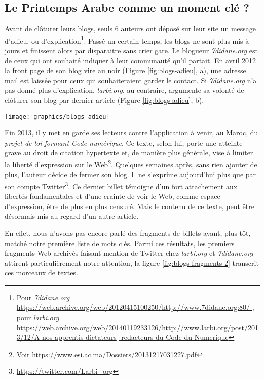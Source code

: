 \documentclass[symmetric,justified,marginals=raggedouter]{tufte-book}
\begin{document}
\subsection{Le Printemps Arabe comme un moment clé ?}

\noindent Avant de clôturer leurs blogs, seuls 6 auteurs ont déposé sur leur site un message d'adieu, ou d'explication\footnote{Pour \textit{7didane.org} \url{https://web.archive.org/web/20120415100250/http://www.7didane.org:80/ 
}, pour \textit{larbi.org} \url{https://web.archive.org/web/20140119233126/http://www.larbi.org/post/2013/12/A-nos-apprentis-dictateurs} \url{-redacteurs-du-Code-du-Numerique}}. Passé un certain temps, les blogs ne sont plus mis à jours et finissent alors par disparaitre sans crier gare. Le blogueur \textit{7didane.org} est de ceux qui ont souhaité indiquer à leur communauté qu'il partait. En avril 2012 la front page de son blog vire au noir (Figure \ref{fig:blogs-adieu}, a), une adresse mail est laissée pour ceux qui souhaiteraient garder le contact. Si \textit{7didane.org} n'a pas donné plus d'explication, \textit{larbi.org}, au contraire, argumente sa volonté de clôturer son blog par dernier article (Figure \ref{fig:blogs-adieu}, b).

\begin{figure*}
  \texttt{[image: graphics/blogs-adieu]}
  \caption{Annonce de la fermeture de \textit{7didane.org} (a) et article précédant la clôture de \textit{larbi.org} (b)}
  \label{fig:blogs-adieu}
\end{figure*} 

\noindent Fin 2013, il y met en garde ses lecteurs contre l'application à venir, au Maroc, du \textit{projet de loi formant Code numérique}. Ce texte, selon lui, porte une atteinte grave au droit de citation hypertexte et, de manière plus générale, vise à limiter la liberté d'expression sur le Web\footnote{Voir \url{https://www.esi.ac.ma/Dossiers/20131217031227.pdf}}. Quelques semaines après, sans rien ajouter de plus, l'auteur décide de fermer son blog. Il ne s'exprime aujourd'hui plus que par son compte Twitter\footnote{\url{https://twitter.com/Larbi_org}}. Ce dernier billet témoigne d'un fort attachement aux libertés fondamentales et d'une crainte de voir le Web, comme espace d'expression, être de plus en plus censuré. Mais le contenu de ce texte, peut être désormais mis au regard d'un autre article. 

En effet, nous n'avons pas encore parlé des fragments de billets ayant, plus tôt, matché notre première liste de mots clés. Parmi ces résultats, les premiers fragments Web archivés faisant mention de Twitter chez \textit{larbi.org} et \textit{7didane.org} attirent particulièrement notre attention, la figure \ref{fig:blogs-fragments-2} transcrit ces morceaux de textes. 
\end{document}
